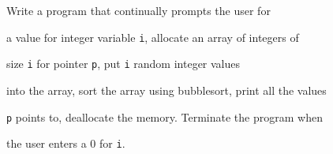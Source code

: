 Write a program that continually prompts the user for

a value for integer variable \texttt{i}, allocate an array of integers of

size \texttt{i} for pointer \texttt{p}, put \texttt{i} random integer values

into the array, sort the array using bubblesort, print all the values

\texttt{p} points to, deallocate the memory. Terminate the program when

the user enters a 0 for \texttt{i}.

